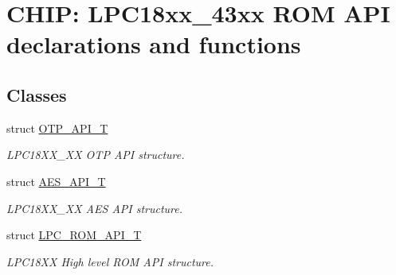 \hypertarget{group___r_o_m_a_p_i__18_x_x__43_x_x}{}\section{C\+H\+IP\+: L\+P\+C18xx\+\_\+43xx R\+OM A\+PI declarations and functions}
\label{group___r_o_m_a_p_i__18_x_x__43_x_x}
\subsection*{Classes}
\begin{DoxyCompactItemize}
\item 
struct \hyperlink{struct_o_t_p___a_p_i___t}{O\+T\+P\+\_\+\+A\+P\+I\+\_\+T}
\begin{DoxyCompactList}\small\item\em L\+P\+C18\+X\+X\+\_\+XX O\+TP A\+PI structure. \end{DoxyCompactList}\item 
struct \hyperlink{struct_a_e_s___a_p_i___t}{A\+E\+S\+\_\+\+A\+P\+I\+\_\+T}
\begin{DoxyCompactList}\small\item\em L\+P\+C18\+X\+X\+\_\+XX A\+ES A\+PI structure. \end{DoxyCompactList}\item 
struct \hyperlink{struct_l_p_c___r_o_m___a_p_i___t}{L\+P\+C\+\_\+\+R\+O\+M\+\_\+\+A\+P\+I\+\_\+T}
\begin{DoxyCompactList}\small\item\em L\+P\+C18\+XX High level R\+OM A\+PI structure. \end{DoxyCompactList}\end{DoxyCompactItemize}
